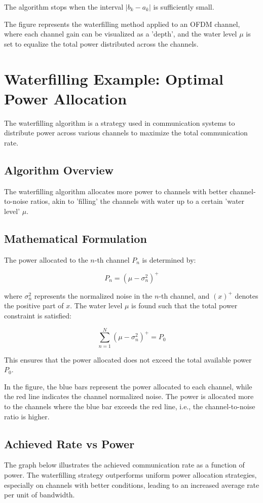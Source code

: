 The algorithm stops when the interval \( |b_k - a_k| \) is sufficiently small.

The figure represents the waterfilling method applied to an OFDM channel, where each channel gain can be visualized as a 'depth', and the water level \(\mu\) is set to equalize the total power distributed across the channels.

\section*{Waterfilling Example: Optimal Power Allocation}

The waterfilling algorithm is a strategy used in communication systems to distribute power across various channels to maximize the total communication rate.

\subsection*{Algorithm Overview}
The waterfilling algorithm allocates more power to channels with better channel-to-noise ratios, akin to 'filling' the channels with water up to a certain 'water level' \(\mu\).

\subsection*{Mathematical Formulation}
The power allocated to the \(n\)-th channel \(P_n\) is determined by:

\[
P_n = \left( \mu - \sigma_{n}^{2} \right)^{+}
\]

where \(\sigma_{n}^{2}\) represents the normalized noise in the \(n\)-th channel, and \((x)^{+}\) denotes the positive part of \(x\). The water level \(\mu\) is found such that the total power constraint is satisfied:

\[
\sum_{n=1}^{N} \left( \mu - \sigma_{n}^{2} \right)^{+} = P_0
\]

This ensures that the power allocated does not exceed the total available power \(P_0\).

In the figure, the blue bars represent the power allocated to each channel, while the red line indicates the channel normalized noise. The power is allocated more to the channels where the blue bar exceeds the red line, i.e., the channel-to-noise ratio is higher.

\subsection*{Achieved Rate vs Power}
The graph below illustrates the achieved communication rate as a function of power. The waterfilling strategy outperforms uniform power allocation strategies, especially on channels with better conditions, leading to an increased average rate per unit of bandwidth.

